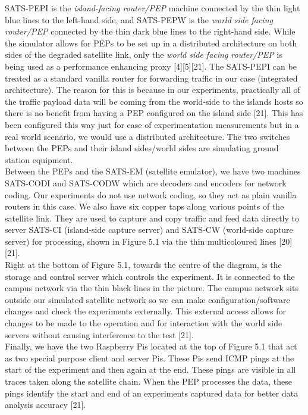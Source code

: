 \documentclass{uathesis}
\begin{document}
SATS-PEPI is the \emph{island-facing router/PEP} machine connected by the thin light blue lines to the left-hand side, and SATS-PEPW is the \emph{world side facing router/PEP} connected by the thin dark blue lines to the right-hand side. While the simulator allows for PEPs to be set up in a distributed architecture on both sides of the degraded satellite link, only the \emph{world side facing router/PEP} is being used as a performance enhancing proxy [4][5][21]. The SATS-PEPI can be treated as a standard vanilla router for forwarding traffic in our case (integrated architecture). The reason for this is because in our experiments, practically all of the traffic payload data will be coming from the world-side to the islands hosts so there is no benefit from having a PEP configured on the island side [21]. This has been configured this way just for ease of experimentation measurements but in a real world scenario, we would use a distributed architecture. The two switches between the PEPs and their island sides/world sides are simulating ground station equipment.\\ 

Between the PEPs and the SATS-EM (satellite emulator), we have two machines SATS-CODI and SATS-CODW which are decoders and encoders for network coding. Our experiments do not use network coding, so they act as plain vanilla routers in this case. We also have six copper taps along various points of the satellite link. They are used to capture and copy traffic and feed data directly to server SATS-CI  (island-side capture server) and SATS-CW (world-side capture server) for processing, shown in Figure 5.1 via the thin multicoloured lines [20][21]. \\

Right at the bottom of Figure 5.1, towards the centre of the diagram, is the storage and control server which controls the experiment. It is connected to the campus network via the thin black lines in the picture. The campus network sits outside our simulated satellite network so we can make configuration/software changes and check the experiments externally. This external access allows for changes to be made to the operation and for interaction with the world side servers without causing interference to the test [21]. \\

Finally, we have the two Raspberry Pis located at the top of Figure 5.1 that act as two special purpose client and server Pis. These Pis send ICMP pings at the start of the experiment and then again at the end. These pings are visible in all traces taken along the satellite chain. When the PEP processes the data, these pings identify the start and end of an experiments captured data for better data analysis accuracy [21]. 
\end{document}
